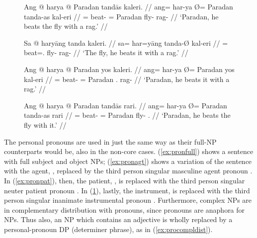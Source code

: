 \begin{figure}[h]
\pex\label{ex:perspro}
\a\label{ex:pronfull}\begingl
	\gla Ang @ harya {} @ Paradan tandās kaleri. //
	\glb ang= har-ya Ø= Paradan tanda-as kal-eri //
	\glc \AgtT{}= beat-\TsgM{} \Top{}= Paradan fly-\Parg{} rag-\Ins{} //
	\glft `Paradan, he beats the fly with a rag.' //
\endgl

\a\label{ex:pronagt}\begingl
	\gla Sa @ haryāng tanda kaleri. //
	\glb sa= har=yāng tanda-Ø kal-eri //
	\glc \PatT{}= beat=\TsgM{}.\Aarg{} fly-\Top{} rag-\Ins{} //
	\glft `The fly, he beats it with a rag.' //
\endgl

\a\label{ex:pronpat}\begingl
	\gla Ang @ harya {} @ Paradan yos kaleri. //
	\glb ang= har-ya Ø= Paradan yos kal-eri //
	\glc \AgtT{}= beat-\TsgM{} \Top{}= Paradan \TsgN{}.\Parg{} rag-\Ins{} //
	\glft `Paradan, he beats it with a rag.' //
\endgl

\a\label{ex:pronins}\begingl
	\gla Ang @ harya {} @ Paradan tandās rari. //
	\glb ang= har-ya Ø= Paradan tanda-as rari //
	\glc \AgtT{}= beat-\TsgM{} \Top{}= Paradan fly-\Parg{} \TsgI{}.\Ins{} //
	\glft `Paradan, he beats the fly with it.' //
\endgl
\xe
\end{figure}

The personal pronouns are used in just the same way as their full-NP
counterparts would be, also in the non-core cases. (\ref{ex:pronfull}) shows a
sentence with full subject and object NPs; (\ref{ex:pronagt}) shows a variation
of the sentence with the agent, , replaced by the third
person singular masculine agent pronoun . In
(\ref{ex:pronpat}), then, the patient, , is replaced
with the third person singular neuter patient pronoun . In
(\ref{ex:pronins}), lastly, the instrument,  is
replaced with the third person singular inanimate instrumental pronoun
. Furthermore, complex NPs are in complementary
distribution with pronouns, since pronouns are anaphora for NPs. Thus also, an
NP which contains an adjective is wholly replaced by a personal-pronoun DP 
(determiner phrase), as in (\ref{ex:procompldist}).

